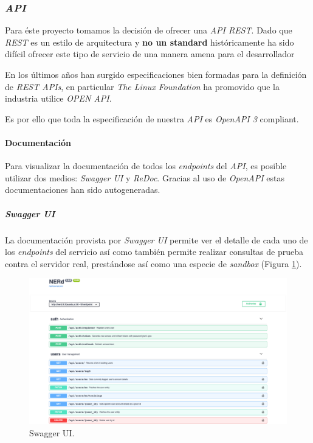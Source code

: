 \documentclass[12pt,a4paper,]{scrartcl}
\let\oldparagraph\paragraph
\renewcommand{\paragraph}[1]{\oldparagraph{#1}\mbox{}}
\let\oldsubparagraph\subparagraph
\renewcommand{\subparagraph}[1]{\oldsubparagraph{#1}\mbox{}}
\begin{document}
\hypertarget{api}{%
\subsubsection{\texorpdfstring{\emph{API}}{API}}\label{api}}

Para éste proyecto tomamos la decisión de ofrecer una \emph{API REST}. Dado que \emph{REST} es un estilo de arquitectura y \textbf{no un standard} históricamente ha sido difícil ofrecer este tipo de servicio de una manera amena para el desarrollador

En los últimos años han surgido especificaciones bien formadas para la definición de \emph{REST APIs}, en particular \emph{The Linux Foundation} ha promovido que la industria utilice \emph{OPEN API}.

Es por ello que toda la especificación de nuestra \emph{API} es \emph{OpenAPI 3} compliant.

\hypertarget{documentaciuxf3n}{%
\paragraph{Documentación}\label{documentaciuxf3n}}

Para visualizar la documentación de todos los \emph{endpoints} del \emph{API}, es posible utilizar dos medios: \emph{Swagger UI} y \emph{ReDoc}. Gracias al uso de \emph{OpenAPI} estas documentaciones han sido autogeneradas.

\hypertarget{swagger-ui}{%
\subparagraph{\texorpdfstring{\emph{Swagger UI}}{Swagger UI}}\label{swagger-ui}}

La documentación provista por \emph{Swagger UI} permite ver el detalle de cada uno de los \emph{endpoints} del servicio así como también permite realizar consultas de prueba contra el servidor real, prestándose así como una especie de \emph{sandbox} (Figura \ref{fig:logic-swagger-main}).

\begin{figure}[H]

{\centering \includegraphics{assets/logic/swagger-main.pdf} 

}

\caption{Swagger UI.}\label{fig:logic-swagger-main}
\end{figure}
\end{document}
